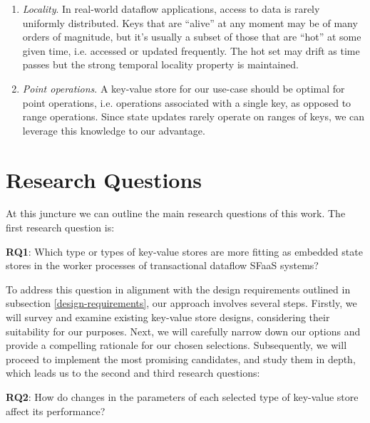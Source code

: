 \begin{enumerate}
    \item \textit{Locality}.
    In real-world dataflow applications, access to data is rarely uniformly distributed.
    Keys that are ``alive'' at any moment may be of many orders of magnitude, but it's usually a subset of those that are ``hot'' at some given time, i.e. accessed or updated frequently.
    The hot set may drift as time passes but the strong temporal locality property is maintained.

    \item \textit{Point operations}.
    A key-value store for our use-case should be optimal for point operations, i.e. operations associated with a single key, as opposed to range operations.
    Since state updates rarely operate on ranges of keys, we can leverage this knowledge to our advantage.
\end{enumerate}

\section{Research Questions}
\label{section-reseach-questions}

At this juncture we can outline the main research questions of this work. The first research question is:\\

\begin{tcolorbox}
    \textbf{RQ1}: Which type or types of key-value stores are more fitting as embedded state stores in the worker processes of transactional dataflow SFaaS systems?
\end{tcolorbox}

\vspace{8px}
To address this question in alignment with the design requirements outlined in subsection \ref{design-requirements}, our approach involves several steps.
Firstly, we will survey and examine existing key-value store designs, considering their suitability for our purposes.
Next, we will carefully narrow down our options and provide a compelling rationale for our chosen selections.
Subsequently, we will proceed to implement the most promising candidates, and study them in depth, which leads us to the second and third research questions:\\

\begin{tcolorbox}
    \textbf{RQ2}: How do changes in the parameters of each selected type of key-value store affect its performance?
\end{tcolorbox}
\vspace{8px}

